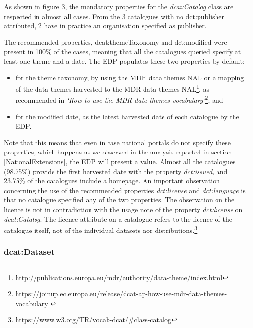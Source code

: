 \documentclass[<options>]{elsarticle}
\begin{document}
As shown in figure 3, the mandatory properties for the \textit{dcat:Catalog} class are respected in almost all cases. From the 3 catalogues with no dct:publisher attributed, 2  have in practice an organisation specified as publisher.

The recommended properties, dcat:themeTaxonomy and dct:modified were present in 100\% of the cases, meaning that all the catalogues queried specify at least one theme and a date. The EDP populates these two properties by default:
\begin{itemize}
\item for the theme taxonomy, by using the MDR data themes NAL or a mapping of the data themes harvested to the MDR data themes NAL\footnote{\href{http://publications.europa.eu/mdr/authority/data-theme/index.html}{ http://publications.europa.eu/mdr/authority/data-theme/index.html}}, as recommended in \textit{`How to use the MDR data themes vocabulary'}\footnote{\href{https://joinup.ec.europa.eu/release/dcat-ap-how-use-mdr-data-themes-vocabulary}{  https://joinup.ec.europa.eu/release/dcat-ap-how-use-mdr-data-themes-vocabulary }}; and
\item for the modified date, as the latest harvested date of each catalogue by the EDP.
\end{itemize}
Note that this means that even in case national portals do not specify these properties, which happens as we observed in the analysis reported in section \ref{NationalExtensions}, the EDP will present a value. Almost all the catalogues (98.75\%) provide the first harvested date with the property \textit{dct:issued}, and 23.75\% of the catalogues include a homepage. 
An important observation concerning the use of the recommended properties \textit{dct:license} and \textit{dct:language} is that no catalogue specified any of the two properties. The observation on the licence is not in contradiction with the usage note of the property \textit{dct:license} on \textit{dcat:Catalog}. The licence attribute on a catalogue refers to the licence of the catalogue itself, not of the individual datasets nor distributions.\footnote{\href{https://www.w3.org/TR/vocab-dcat/\#class-catalog}{https://www.w3.org/TR/vocab-dcat/\#class-catalog}} 

\subsubsection{dcat:Dataset}
\end{document}
